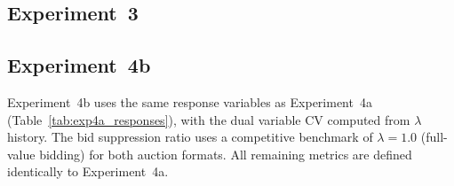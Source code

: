 

\subsection{Experiment~3}



\subsection{Experiment~4b}

Experiment~4b uses the same response variables as Experiment~4a (Table~\ref{tab:exp4a_responses}), with the dual variable CV computed from $\lambda$ history. The bid suppression ratio uses a competitive benchmark of $\lambda = 1.0$ (full-value bidding) for both auction formats. All remaining metrics are defined identically to Experiment~4a.


